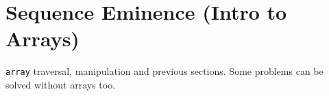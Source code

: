 \documentclass[../../Problems]{subfiles}
\begin{document}
\section{Sequence Eminence (Intro to Arrays)}{\label{sec:sequences}}
\begin{topics}
\verb!array! traversal, manipulation and previous sections. Some problems can be solved without arrays too.
\end{topics}






\end{document}

